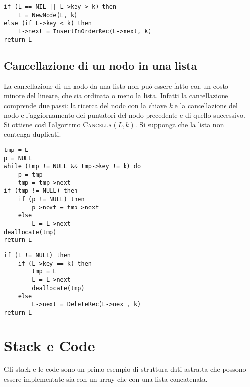 \begin{lstlisting}[label = lst:InsertInOrderRec, language=asd, caption={InsertInOrder-Rec(L,k)}]
if (L == NIL || L->key > k) then
    L = NewNode(L, k)
else (if L->key < k) then
    L->next = InsertInOrderRec(L->next, k)
return L
\end{lstlisting}

\subsection{Cancellazione di un nodo in una lista}
La cancellazione di un nodo da una lista non può essere fatto con un costo minore del lineare, che sia ordinata o meno la lista. Infatti la cancellazione comprende due passi: la ricerca del nodo con la chiave $k$ e la cancellazione del nodo e l'aggiornamento dei puntatori del nodo precedente e di quello successivo. Si ottiene così l'algoritmo \textsc{Cancella}$(L,k)$. Si supponga che la lista non contenga duplicati.

\begin{center}
	\begin{minipage}{0.4\textwidth}
	\begin{lstlisting}[label=lst:DeleteIter,language=asd,caption={\textsc{DeleteIter}(L,k)}]
tmp = L
p = NULL
while (tmp != NULL && tmp->key != k) do
    p = tmp
    tmp = tmp->next
if (tmp != NULL) then
    if (p != NULL) then
        p->next = tmp->next
    else
        L = L->next
deallocate(tmp)
return L
\end{lstlisting}
\end{minipage}
\begin{minipage}{0.4\textwidth}
	\begin{lstlisting}[label=lst:DeleteRec, language=asd, caption={\textsc{DeleteRec}(L, k)}]
if (L != NULL) then
    if (L->key == k) then
        tmp = L
        L = L->next
        deallocate(tmp)
    else
        L->next = DeleteRec(L->next, k)
return L
\end{lstlisting}
\end{minipage}
\end{center}

\section{Stack e Code}
Gli stack e le code sono un primo esempio di struttura dati astratta che possono essere implementate sia con un array che con una lista concatenata.
